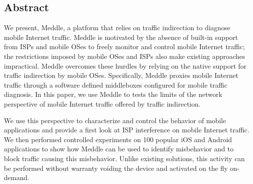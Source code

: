 \subsection*{Abstract}

We present, Meddle, a platform that relies on traffic indirection to diagnose mobile Internet traffic.
Meddle is motivated by the absence of built-in support from ISPs and mobile OSes to freely monitor and control mobile Internet traffic; the restrictions imposed by mobile OSes and ISPs also make existing approaches impractical.
Meddle overcomes these hurdles by relying on the native support for traffic indirection by mobile OSes.
Specifically, Meddle proxies mobile Internet traffic through a software defined middleboxes configured for mobile traffic diagnosis. 
In this paper, we use Meddle to tests the limits of the network perspective of mobile Internet traffic offered by traffic indirection. 

We use this perspective to characterize and control the behavior of mobile applications and provide a first look at ISP interference on mobile Internet traffic. 
We then performed controlled experiments on 100 popular iOS and Android applications to show how Meddle can be used to identify misbehavior and to block traffic causing this misbehavior. 
Unlike existing solutions, this activity can be performed without warranty voiding the device and activated on the fly on-demand. 








